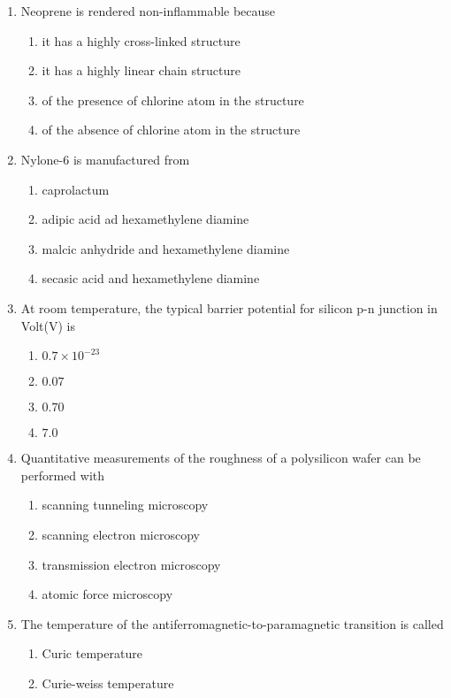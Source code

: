 \documentclass[journal,12pt,onecolumn]{IEEEtran}
\theoremstyle{remark}
\begin{document}
\begin{enumerate}
\item Neoprene is rendered non-inflammable because 
\begin{enumerate}
    \item it has a highly cross-linked structure 
    \item it has a highly linear chain structure 
    \item of the presence of chlorine atom in the structure 
    \item of the absence of chlorine atom in the structure \\
\end{enumerate}
\item Nylone-$6$ is manufactured from 
\begin{enumerate}
    \item caprolactum 
    \item adipic acid ad hexamethylene diamine 
    \item malcic anhydride and hexamethylene diamine 
    \item secasic acid and hexamethylene diamine\\
\end{enumerate}
\item At room temperature, the typical barrier potential for silicon p-n junction in Volt(V) is 
\begin{enumerate}
    \item $0.7\times 10^{-23}$
    \item $0.07$
    \item $0.70$
    \item $7.0$\\
\end{enumerate}
\item Quantitative measurements of the roughness of a polysilicon wafer can be performed with 
\begin{enumerate}
    \item scanning tunneling microscopy 
    \item scanning electron microscopy
    \item transmission electron microscopy 
    \item atomic force microscopy\\
\end{enumerate}
\item The temperature of the antiferromagnetic-to-paramagnetic transition is called 
\begin{enumerate}
    \item Curic temperature
    \item Curie-weiss temperature 

\end{enumerate}
\end{enumerate}
\end{document}
